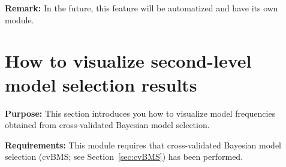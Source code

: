 \documentclass[a4paper,12pt]{article}
\begin{document}
\textbf{Remark:} In the future, this feature will be automatized and have its own module.



\pagebreak
{}
\section[How to visualize second-level model selection results]{How to visualize second-level \\ model selection results} \label{sec:cvBMS-vis}

\textbf{Purpose:} This section introduces you how to visualize model frequencies obtained from cross-validated Bayesian model selection.

\textbf{Requirements:} This module requires that cross-validated Bayesian model selection (cvBMS; see Section~\ref{sec:cvBMS}) has been performed.
\end{document}
